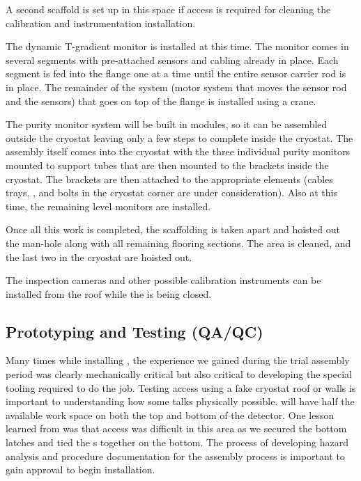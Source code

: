 A second scaffold is set up in this space if access is required  for cleaning the calibration and instrumentation installation.

The dynamic T-gradient monitor is installed at this time. 
The monitor comes in several segments with pre-attached sensors and cabling already in place. Each segment is fed into the flange one at a time until the entire sensor carrier rod is in place. The remainder of the system (motor system that moves the sensor rod and the sensors) that goes on top of the flange is installed using a crane. 

The purity monitor system will be built in modules, so it can be assembled outside the cryostat leaving only a few steps to complete inside the cryostat. 
The assembly itself comes into the cryostat with the three individual purity monitors mounted to support tubes that are then mounted to the brackets inside the cryostat. The brackets are then attached to the appropriate elements (cables trays, , and bolts in the cryostat corner are under consideration). Also at this time, the remaining level monitors are installed.

Once all this work is completed, the scaffolding is taken apart and hoisted out the man-hole along with all remaining flooring sections. The area is cleaned, and the last two  in the cryostat are hoisted out. 

The inspection cameras and other possible calibration instruments can be installed from the roof while the  is being closed.



\clearpage




\subsection{Prototyping and Testing (QA/QC)}
\label{sec:fdsp-tc-inst-qaqc}


Many times while installing , the experience we gained during the trial assembly period was clearly mechanically critical but also critical to developing the special tooling required to do the job.  Testing access using a fake cryostat roof or walls is important to understanding how some talks physically possible.  will have half the available work space on both the top and bottom of the detector.  One lesson learned from  was that access was difficult in this area as we secured the bottom latches and tied the s together on the bottom.  The process of developing hazard analysis and procedure documentation for the assembly process is important to gain approval to begin installation.   

